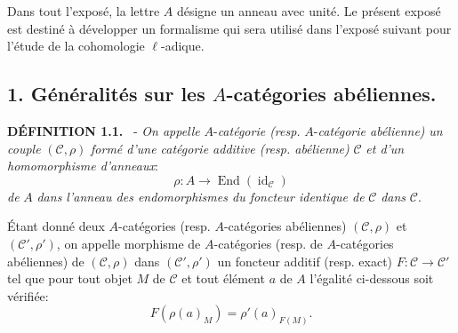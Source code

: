 \documentclass[11pt]{article}
\newenvironment{statement}[1]{\par\medskip\noindent\textbf{#1.}\ }{\par\medskip}
\providecommand{\id}{\operatorname{id}}
\providecommand{\cC}{\mathcal C}
\providecommand{\End}{\operatorname{End}}
\providecommand{\id}{\operatorname{id}}
\providecommand{\id}{\operatorname{id}}
\providecommand{\End}{\operatorname{End}}
\providecommand{\id}{\operatorname{id}}
\providecommand{\id}{\operatorname{id}}
\providecommand{\cC}{\mathcal C}
\providecommand{\id}{\operatorname{id}}
\begin{document}
Dans tout l'exposé, la lettre $A$ désigne un anneau avec unité. Le présent exposé est destiné à développer un formalisme qui sera utilisé dans l'exposé suivant pour l'étude de la cohomologie $\ell$-adique.

\subsection*{1. Généralités sur les $A$-catégories abéliennes.}

\begin{statement}{DÉFINITION 1.1}
- \emph{On appelle} $A$-\emph{catégorie (resp.} $A$-\emph{catégorie abélienne)} \emph{un couple} $(\cC,\rho)$ \emph{formé d'une catégorie additive (resp. abélienne)} $\cC$ \emph{et d'un homomorphisme d'anneaux}:
\[
\rho:A\longrightarrow \End(\id_{\cC})
\]
\emph{de} $A$ \emph{dans l'anneau des endomorphismes du foncteur identique de} $\cC$ \emph{dans} $\cC$.
\end{statement}

Étant donné deux $A$-catégories (resp. $A$-catégories abéliennes) $(\cC,\rho)$ et $(\cC',\rho')$, on appelle morphisme de $A$-catégories (resp. de $A$-catégories abéliennes) de $(\cC,\rho)$ dans $(\cC',\rho')$ un foncteur additif (resp. exact) $F:\cC\to\cC'$ tel que pour tout objet $M$ de $\cC$ et tout élément $a$ de $A$ l'égalité ci-dessous soit vérifiée:
\[
F(\rho(a)_M)=\rho'(a)_{F(M)}.
\]
\end{document}

